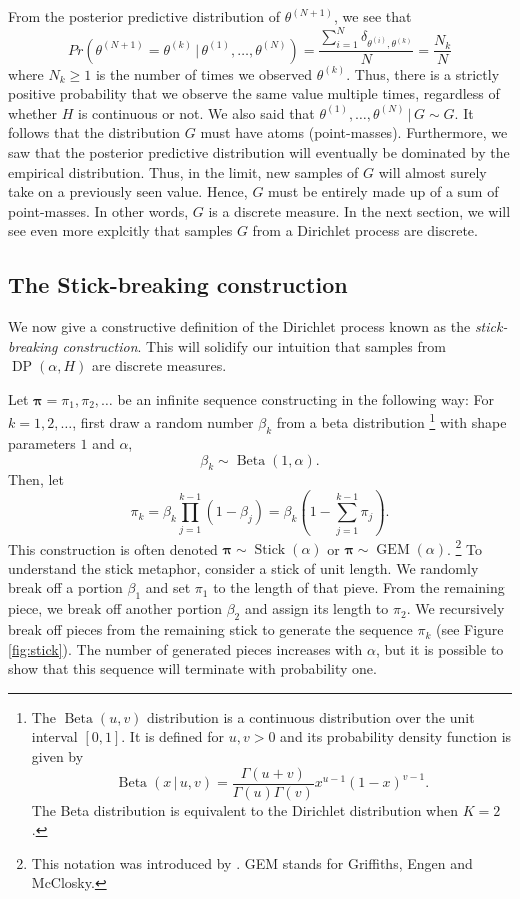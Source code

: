 \documentclass[final,3p,times,twocolumn]{elsarticle}
\DeclareMathOperator*{\DP}{DP}
\DeclareMathOperator*{\Beta}{Beta}
\DeclareMathOperator*{\GEM}{GEM}
\DeclareMathOperator*{\Stick}{Stick}
\let\bs\boldsymbol
\begin{document}
From the posterior predictive distribution of $\theta^{(N+1)}$, we see that
\begin{equation}
\label{eqn:dpprobsame}
Pr(\theta^{(N+1)} = \theta^{(k)} \,|\,\theta^{(1)},\dots,\theta^{(N)}) = \frac{\sum_{i=1}^N \delta_{\theta^{(i)},\theta^{(k)}}}{N} = \frac{N_k}{N}
\end{equation}
where $N_k \geq 1$ is the number of times we observed $\theta^{(k)}$.
Thus, there is a strictly positive probability that we observe the same value multiple times, regardless of whether $H$ is continuous or not.
We also said that $\theta^{(1)},\dots,\theta^{(N)} \,|\,G \sim G$.
It follows that the distribution $G$ must have atoms (point-masses).
Furthermore, we saw that the posterior predictive distribution will eventually be dominated by the empirical distribution.
Thus, in the limit, new samples of $G$ will almost surely take on a previously seen value. 
Hence, $G$ must be entirely made up of a sum of point-masses. 
In other words, $G$ is a discrete measure.
In the next section, we will see even more explcitly that samples $G$ from a Dirichlet process are discrete.

\subsection{The Stick-breaking construction}
We now give a constructive definition of the Dirichlet process known as the \emph{stick-breaking construction}.
This will solidify our intuition that samples from $\DP(\alpha,H)$ are discrete measures.

Let $\bs \pi = {\pi_1,\pi_2,\dots}$ be an infinite sequence constructing in the following way:
For $k=1,2,\dots$, first draw a random number $\beta_k$ from a beta distribution
\footnote{The $\Beta(u,v)$ distribution is a continuous distribution over the unit interval $[0,1]$. It is defined for $u,v > 0$ and its probability density function is given by
\[
\Beta(x\,|\,u,v) = \frac{\Gamma(u+v)}{\Gamma(u)\Gamma(v)}x^{u-1}(1-x)^{v-1}.
\]
The Beta distribution is equivalent to the Dirichlet distribution when $K=2$.}
with shape parameters $1$ and $\alpha$,
\begin{equation}
\beta_k \sim \Beta(1,\alpha).
\end{equation}
Then, let
\begin{equation}
\pi_k = \beta_k \prod_{j=1}^{k-1} (1-\beta_j) = \beta_k (1 - \sum_{j=1}^{k-1} \pi_j).
\end{equation}
This construction is often denoted $\bs \pi \sim \Stick(\alpha)$ or $\bs \pi \sim \GEM(\alpha)$.
\footnote{
This notation was introduced by \cite{ewens1990}.
GEM stands for Griffiths, Engen and McClosky.}
To understand the stick metaphor, consider a stick of unit length. 
We randomly break off a portion $\beta_1$ and set $\pi_1$ to the length of that pieve. 
From the remaining piece, we break off another portion $\beta_2$ and assign its length to $\pi_2$.
We recursively break off pieces from the remaining stick to generate the sequence $\pi_k$ (see Figure \ref{fig:stick}).
The number of generated pieces increases with $\alpha$, but it is possible to show that this sequence will terminate with probability one.
\end{document}
